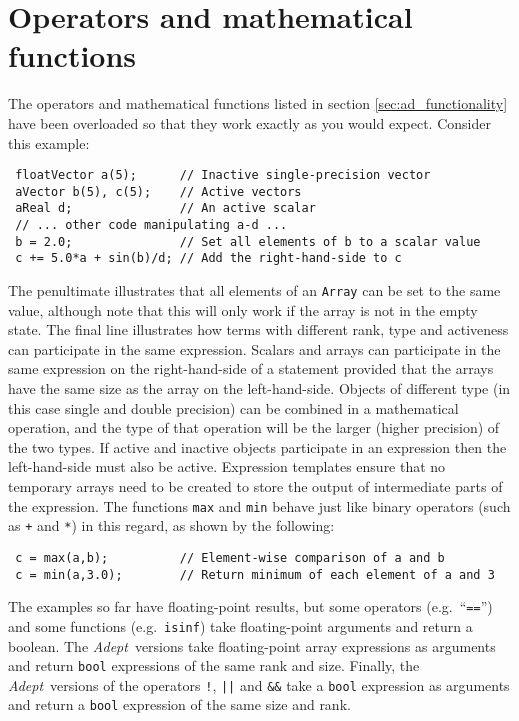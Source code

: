 \documentclass[a4,oneside]{book}
\def\codesize{\small}
\def\Adept{\emph{Adept}}
\def\code#1{{\codesize\texttt{#1}}}
\begin{document}
\section{Operators and mathematical functions}
\label{sec:operators}
The operators and mathematical functions listed in section
\ref{sec:ad_functionality} have been overloaded so that they work exactly as you
would expect. Consider this example:
\begin{lstlisting}
 floatVector a(5);      // Inactive single-precision vector
 aVector b(5), c(5);    // Active vectors
 aReal d;               // An active scalar
 // ... other code manipulating a-d ...
 b = 2.0;               // Set all elements of b to a scalar value
 c += 5.0*a + sin(b)/d; // Add the right-hand-side to c
\end{lstlisting}
The penultimate illustrates that all elements of an \code{Array} can
be set to the same value, although note that this will only work if
the array is not in the empty state. The final line illustrates how
terms with different rank, type and activeness can participate in the
same expression. Scalars and arrays can participate in the same
expression on the right-hand-side of a statement provided that the
arrays have the same size as the array on the left-hand-side. Objects
of different type (in this case single and double precision) can be
combined in a mathematical operation, and the type of that operation
will be the larger (higher precision) of the two types. If active and
inactive objects participate in an expression then the left-hand-side
must also be active. Expression templates ensure that no temporary
arrays need to be created to store the output of intermediate parts of
the expression.  The functions \code{max} and \code{min} behave just
like binary operators (such as \code{+} and \code{*}) in this regard,
as shown by the following:
\begin{lstlisting}
 c = max(a,b);          // Element-wise comparison of a and b 
 c = min(a,3.0);        // Return minimum of each element of a and 3
\end{lstlisting}

The examples so far have floating-point results, but some operators
(e.g.\ ``\code{==}'') and some functions (e.g.\ \code{isinf}) take
floating-point arguments and return a boolean.  The \Adept\ versions
take floating-point array expressions as arguments and return
\code{bool} expressions of the same rank and size. Finally, the
\Adept\ versions of the operators \code{!}, \code{||} and \code{\&\&}
take a \code{bool} expression as arguments and return a \code{bool}
expression of the same size and rank.
\end{document}

